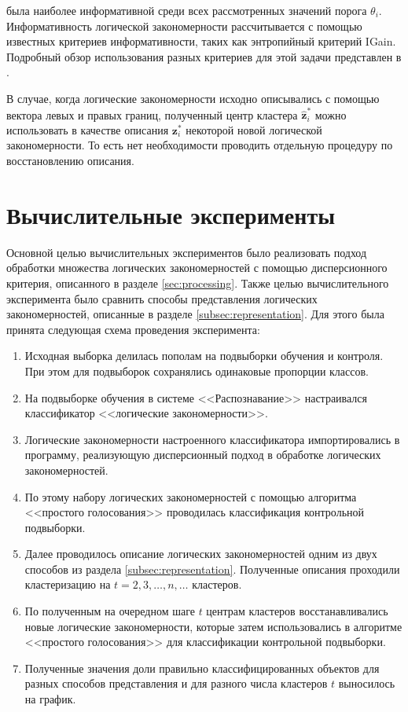 \documentclass[12pt]{article}
\begin{document}
была наиболее информативной среди всех рассмотренных значений порога
\(\theta_i\). Информативность логической закономерности рассчитывается
с помощью известных критериев информативности, таких как энтропийный
критерий IGain. Подробный обзор использования разных критериев для
этой задачи представлен в \cite{novikov15}.

В случае, когда логические закономерности исходно описывались с
помощью вектора левых и правых границ, полученный центр кластера
\(\bm{\hat{z}}_i^*\) можно использовать в качестве описания
\(\bm{z}_i^*\) некоторой новой логической закономерности. То есть нет
необходимости проводить отдельную процедуру по восстановлению
описания.

\section{Вычислительные эксперименты}
\label{sec:experiments}

Основной целью вычислительных экспериментов было реализовать подход
обработки множества логических закономерностей с помощью
дисперсионного критерия, описанного в разделе
\ref{sec:processing}. Также целью вычислительного эксперимента было
сравнить способы представления логических закономерностей, описанные в
разделе \ref{subsec:representation}. Для этого была принята следующая
схема проведения эксперимента:

\begin{enumerate}
  \item Исходная выборка делилась пополам на подвыборки обучения и
    контроля. При этом для подвыборок сохранялись одинаковые пропорции
    классов.
  \item На подвыборке обучения в системе <<Распознавание>>
    \cite{recognition06} настраивался классификатор <<логические
    закономерности>>.
  \item Логические закономерности настроенного классификатора
    импортировались в программу, реализующую дисперсионный подход в
    обработке логических закономерностей.
  \item По этому набору логических закономерностей с помощью
    алгоритма <<простого голосования>> \cite{voron10logicalgs}
    проводилась классификация контрольной подвыборки.
  \item Далее проводилось описание логических закономерностей одним из
    двух способов из раздела \ref{subsec:representation}. Полученные
    описания проходили кластеризацию на \(t = 2, 3, \dots, n, \dots\)
    кластеров.
  \item По полученным на очередном шаге \(t\) центрам кластеров
    восстанавливались новые логические закономерности, которые затем
    использовались в алгоритме <<простого голосования>> для
    классификации контрольной подвыборки.
  \item Полученные значения доли правильно классифицированных объектов
    для разных способов представления и для разного числа кластеров
    \(t\) выносилось на график.
\end{enumerate}
\end{document}
